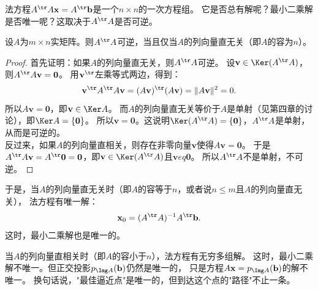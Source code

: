 \documentclass[12pt,UTF8,fontset=none]{ctexbook}
\begin{document}
法方程$A^{\tr} A \mathbf{x} = A^{\tr} \mathbf{b}$是一个$n \times n$的一次方程组。
它是否总有解呢？最小二乘解是否唯一呢？这取决于$A^{\tr} A$是否可逆。

\begin{pp}\label{pp:7_11}
设$A$为$m \times n$实矩阵。则$A^{\tr} A$可逆，当且仅当$A$的列向量直无关（即$A$的容为$n$）。
\end{pp}

\begin{proof} %
首先证明：如果$A$的列向量直无关，则$A^{\tr} A$可逆。
设$\mathbf{v} \in \Ker(A^{\tr} A)$，则$A^{\tr} A \mathbf{v} = \mathbf{0}$。
用$\mathbf{v}^{\tr}$左乘等式两边，得到：
$$ \mathbf{v}^{\tr} A^{\tr} A \mathbf{v} = (A\mathbf{v})^{\tr}(A\mathbf{v}) = \|A\mathbf{v}\|^2 = 0. $$
所以$A\mathbf{v} = \mathbf{0}$，即$\mathbf{v} \in \Ker A$。
而$A$的列向量直无关等价于$A$是单射（见第四章的讨论），即$\Ker A = \{\mathbf{0}\}$。
所以$\mathbf{v} = \mathbf{0}$。这说明$\Ker(A^{\tr} A) = \{\mathbf{0}\}$，$A^{\tr} A$是单射，从而是可逆的。\\
反过来，如果$A$的列向量直相关，则存在非零向量$\mathbf{v}$使得$A\mathbf{v} = \mathbf{0}$。
于是$A^{\tr} A \mathbf{v} = A^{\tr} \mathbf{0} = \mathbf{0}$，即$\mathbf{v} \in \Ker(A^{\tr} A)$且$\mathbf{v}
eq \mathbf{0}$。
所以$A^{\tr} A$不是单射，不可逆。
\end{proof}

于是，当$A$的列向量直无关时（即$A$的容等于$n$，或者说$n \leqslant m$且$A$的列向量直无关），
法方程有唯一解：
$$ \mathbf{x}_0 = (A^{\tr} A)^{-1} A^{\tr} \mathbf{b}. $$
这时，最小二乘解也是唯一的。

当$A$的列向量直相关时（即$A$的容小于$n$），法方程有无穷多组解。
这时，最小二乘解不唯一。但正交投影$p_{\Img A}(\mathbf{b})$仍然是唯一的，
只是方程$A\mathbf{x} = p_{\Img A}(\mathbf{b})$的解不唯一。
换句话说，"最佳逼近点"是唯一的，但到达这个点的"路径"不止一条。
\end{document}

